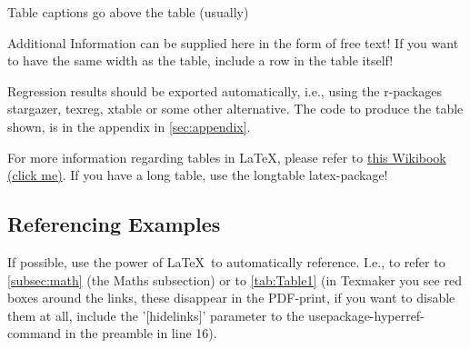 \documentclass[12pt,a4paper]{article}
\begin{document}
\begin{table}[h!]
\centering
\caption{Table captions go above the table (usually)}
\label{tab:Table1}


\bigskip
\small Additional Information can be supplied here in the form of free text! If you want to have the same width as the table, include a row in the table itself!
\end{table}

Regression results should be exported automatically, i.e., using the r-packages stargazer, texreg, xtable or some other alternative. The code to produce the table shown, is in the appendix in \autoref{sec:appendix}. 

For more information regarding tables in \LaTeX, please refer to \href{https://en.wikibooks.org/wiki/LaTeX/Tables}{this Wikibook (click me)}. If you have a long table, use the longtable latex-package!
\newpage

\subsection{Referencing Examples}
\label{subsec:references}
If possible, use the power of \LaTeX \ to automatically reference. I.e., to refer to \autoref{subsec:math} (the Maths subsection) or to \autoref{tab:Table1} (in Texmaker you see red boxes around the links, these disappear in the PDF-print, if you want to disable them at all, include the '[hidelinks]' parameter to the usepackage-hyperref-command in the preamble in line 16).





\end{document}
